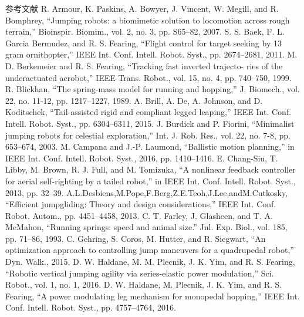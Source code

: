 \begin{translation}
{\heiti 参考文献} \newline
[1] R. Armour, K. Paskins, A. Bowyer, J. Vincent, W. Megill, and R. Bomphrey, “Jumping robots: a biomimetic solution to locomotion across rough terrain,” Bioinspir. Biomim., vol. 2, no. 3, pp. S65–82, 2007. \newline
[2] S. S. Baek, F. L. Garcia Bermudez, and R. S. Fearing, “Flight control for target seeking by 13 gram ornithopter,” IEEE Int. Conf. Intell. Robot. Syst., pp. 2674–2681, 2011. \newline
[3] M. D. Berkemeier and R. S. Fearing, “Tracking fast inverted trajecto- ries of the underactuated acrobot,” IEEE Trans. Robot., vol. 15, no. 4, pp. 740–750, 1999. \newline
[4] R. Blickhan, “The spring-mass model for running and hopping,” J. Biomech., vol. 22, no. 11-12, pp. 1217–1227, 1989. \newline
[5] A. Brill, A. De, A. Johnson, and D. Koditschek, “Tail-assisted rigid and compliant legged leaping,” IEEE Int. Conf. Intell. Robot. Syst., pp. 6304–6311, 2015. \newline
[6] J. Burdick and P. Fiorini, “Minimalist jumping robots for celestial exploration,” Int. J. Rob. Res., vol. 22, no. 7-8, pp. 653–674, 2003. \newline
[7] M. Campana and J.-P. Laumond, “Ballistic motion planning,” in IEEE Int. Conf. Intell. Robot. Syst., 2016, pp. 1410–1416. \newline
[8] E. Chang-Siu, T. Libby, M. Brown, R. J. Full, and M. Tomizuka, “A nonlinear feedback controller for aerial self-righting by a tailed robot,” in IEEE Int. Conf. Intell. Robot. Syst., 2013, pp. 32–39. \newline
[9] A.L.Desbiens,M.Pope,F.Berg,Z.E.Teoh,J.Lee,andM.Cutkosky, “Efficient jumpgliding: Theory and design considerations,” IEEE Int. Conf. Robot. Autom., pp. 4451–4458, 2013. \newline
[10] C. T. Farley, J. Glasheen, and T. A. McMahon, “Running springs: speed and animal size.” Jnl. Exp. Biol., vol. 185, pp. 71–86, 1993. \newline
[11] C. Gehring, S. Coros, M. Hutter, and R. Siegwart, “An optimization approach to controlling jump maneuvers for a quadrupedal robot,” Dyn. Walk., 2015. \newline
[12] D. W. Haldane, M. M. Plecnik, J. K. Yim, and R. S. Fearing, “Robotic vertical jumping agility via series-elastic power modulation,” Sci. Robot., vol. 1, no. 1, 2016. \newline
[13] D. W. Haldane, M. Plecnik, J. K. Yim, and R. S. Fearing, “A power modulating leg mechanism for monopedal hopping,” IEEE Int. Conf. Intell. Robot. Syst., pp. 4757–4764, 2016. \newline

\end{translation}
